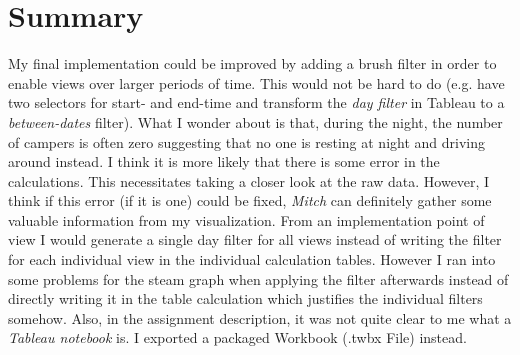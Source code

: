 \documentclass{article}
\begin{document}
\section{Summary}
My final implementation could be improved by adding a brush filter in order to enable views over larger periods of time. This would not be hard to do (e.g. have two selectors for start- and end-time and transform the \textit{day filter} in Tableau to a \textit{between-dates} filter).
What I wonder about is that, during the night, the number of campers is often zero suggesting that no one is resting at night and driving around instead. I think it is more likely that there is some error in the calculations. This necessitates taking a closer look at the raw data. However, I think if this error (if it is one) could be fixed, \textit{Mitch} can definitely gather some valuable information from my visualization. From an implementation point of view I would generate a single day filter for all views instead of writing the filter for each individual view in the individual calculation tables. However I ran into some problems for the steam graph when applying the filter afterwards instead of directly writing it in the table calculation which justifies the individual filters somehow. Also, in the assignment description, it was not quite clear to me what a \textit{Tableau notebook} is. I exported a  packaged Workbook (.twbx File) instead.



\end{document}
